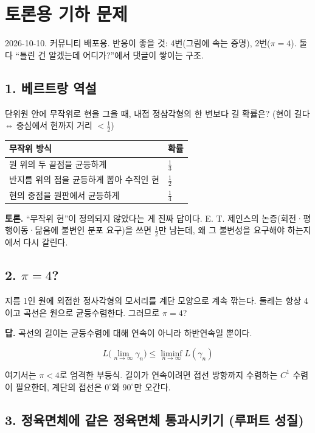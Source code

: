 \section{토론용 기하 문제}

2026-10-10. 커뮤니티 배포용. 반응이 좋을 것: 4번(그림에 속는 증명),
2번(\(\pi=4\)). 둘 다 ``틀린 건 알겠는데 어디가?''에서 댓글이 쌓이는
구조.

\subsection{1. 베르트랑 역설}

단위원 안에 무작위로 현을 그을 때, 내접 정삼각형의 한 변보다 길 확률은?
(현이 길다 ⇔ 중심에서 현까지 거리 \(<\tfrac12\))

\begin{longtable}[]{@{}ll@{}}
\toprule\noalign{}
무작위 방식 & 확률 \\
\midrule\noalign{}
\endhead
\bottomrule\noalign{}
\endlastfoot
원 위의 두 끝점을 균등하게 & \(\tfrac13\) \\
반지름 위의 점을 균등하게 뽑아 수직인 현 & \(\tfrac12\) \\
현의 중점을 원판에서 균등하게 & \(\tfrac14\) \\
\end{longtable}

\textbf{토론.} ``무작위 현''이 정의되지 않았다는 게 진짜 답이다. E. T.
제인스의 논증(회전·평행이동·닮음에 불변인 분포 요구)을 쓰면
\(\tfrac12\)만 남는데, 왜 그 불변성을 요구해야 하는지에서 다시 갈린다.

\subsection{\texorpdfstring{2. \(\pi=4\)?}{2. \textbackslash pi=4?}}

지름 1인 원에 외접한 정사각형의 모서리를 계단 모양으로 계속 깎는다.
둘레는 항상 4이고 곡선은 원으로 균등수렴한다. 그러므로 \(\pi=4\)?

\textbf{답.} 곡선의 길이는 균등수렴에 대해 연속이 아니라 하반연속일
뿐이다.

\[
L\Big(\lim_{n\to\infty}\gamma_n\Big)\le\liminf_{n\to\infty}L(\gamma_n)
\]

여기서는 \(\pi<4\)로 엄격한 부등식. 길이가 연속이려면 접선 방향까지
수렴하는 \(C^1\) 수렴이 필요한데, 계단의 접선은 \(0^\circ\)와
\(90^\circ\)만 오간다.

\subsection{3. 정육면체에 같은 정육면체 통과시키기 (루퍼트 성질)}

